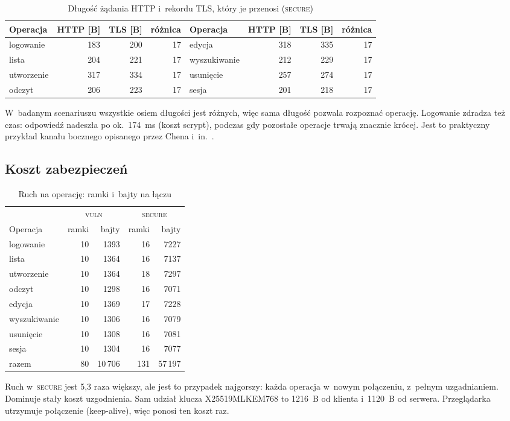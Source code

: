 \documentclass[12pt,a4paper]{article}
\newcommand{\vuln}{\textsc{vuln}}
\newcommand{\secure}{\textsc{secure}}
\begin{document}
\begin{table}[H]\centering\caption{Długość żądania HTTP i~rekordu TLS, który je przenosi (\secure)}\label{tab:rozm}
\small
\begin{tabular}{lrrr@{\hskip 3mm}lrrr}
\toprule
Operacja & HTTP [B] & TLS [B] & różnica & Operacja & HTTP [B] & TLS [B] & różnica\\\midrule
logowanie & 183 & 200 & 17 & edycja & 318 & 335 & 17\\
lista & 204 & 221 & 17 & wyszukiwanie & 212 & 229 & 17\\
utworzenie & 317 & 334 & 17 & usunięcie & 257 & 274 & 17\\
odczyt & 206 & 223 & 17 & sesja & 201 & 218 & 17\\
\bottomrule
\end{tabular}
\end{table}
W~badanym scenariuszu wszystkie osiem długości jest różnych, więc sama długość pozwala rozpoznać operację. Logowanie zdradza też czas: odpowiedź nadeszła po ok.~174~ms (koszt scrypt), podczas gdy pozostałe operacje trwają znacznie krócej. Jest to praktyczny przykład kanału bocznego opisanego przez Chena i~in.~\cite{chen}.

\subsection{Koszt zabezpieczeń}
\begin{table}[H]\centering\caption{Ruch na operację: ramki i~bajty na łączu}\label{tab:ops}
\begin{tabular}{lrrrr}
\toprule
& \multicolumn{2}{c}{\vuln} & \multicolumn{2}{c}{\secure}\\
Operacja & ramki & bajty & ramki & bajty\\\midrule
logowanie & 10 & 1393 & 16 & 7227\\
lista & 10 & 1364 & 16 & 7137\\
utworzenie & 10 & 1364 & 18 & 7297\\
odczyt & 10 & 1298 & 16 & 7071\\
edycja & 10 & 1369 & 17 & 7228\\
wyszukiwanie & 10 & 1306 & 16 & 7079\\
usunięcie & 10 & 1308 & 16 & 7081\\
sesja & 10 & 1304 & 16 & 7077\\\midrule
razem & 80 & 10\,706 & 131 & 57\,197\\
\bottomrule
\end{tabular}
\end{table}
Ruch w~\secure{} jest 5{,}3 raza większy, ale jest to przypadek najgorszy: każda operacja w~nowym połączeniu, z~pełnym uzgadnianiem. Dominuje stały koszt uzgodnienia. Sam udział klucza X25519MLKEM768 to 1216~B od klienta i~1120~B od serwera. Przeglądarka utrzymuje połączenie (keep-alive), więc ponosi ten koszt raz.
\end{document}
